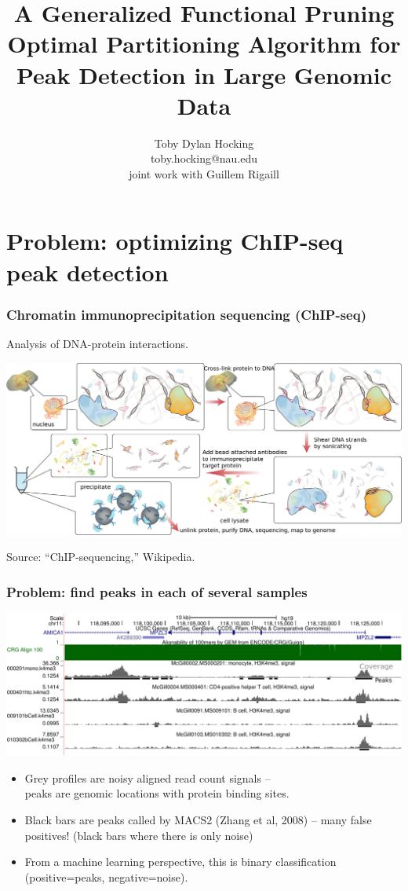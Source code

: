 \documentclass{beamer}
\begin{document}
\title{
A Generalized Functional Pruning Optimal Partitioning Algorithm
for Peak Detection in Large Genomic Data
}

\author{
  Toby Dylan Hocking\\
  toby.hocking@nau.edu\\
  joint work with Guillem Rigaill}


\maketitle

\section{Problem: optimizing ChIP-seq peak detection}

\begin{frame}
  \frametitle{Chromatin immunoprecipitation sequencing (ChIP-seq)}
  Analysis of DNA-protein interactions.

  \includegraphics[width=\textwidth]{Chromatin_immunoprecipitation_sequencing_wide.png}

  Source: ``ChIP-sequencing,'' Wikipedia.
\end{frame}

\begin{frame}
  \frametitle{Problem: find peaks in each of several samples}
  \includegraphics[width=\textwidth]{screenshot-ucsc-edited}

  \begin{itemize}
  \item Grey profiles are noisy aligned read count signals -- \\peaks
    are genomic locations with protein binding sites.
  \item Black bars are peaks called by MACS2 (Zhang et al, 2008) -- many
    false positives! (black bars where there is only noise)
  \item From a machine learning perspective, this is binary
    classification (positive=peaks, negative=noise).
  \end{itemize}
\end{frame}
\end{document}
